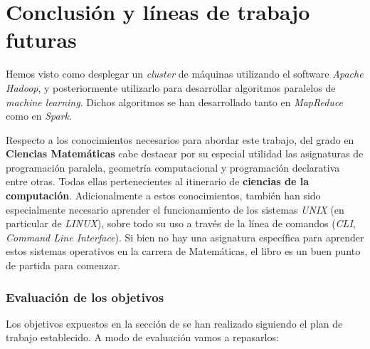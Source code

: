 \chapter*{Conclusión y líneas de trabajo futuras}
Hemos visto como desplegar un \textit{cluster} de máquinas utilizando el software  \textit{Apache Hadoop}, 
y posteriormente utilizarlo para desarrollar algoritmos paralelos de \textit{machine learning}. Dichos algoritmos
se han desarrollado tanto en \textit{MapReduce} como en \textit{Spark}.

Respecto a los conocimientos necesarios para abordar este trabajo, del grado en \textbf{Ciencias Matemáticas}
cabe destacar por su especial utilidad las asignaturas de programación paralela, geometría computacional y 
programación declarativa entre otras. Todas ellas pertenecientes al itinerario de \textbf{ciencias de la computación}.
Adicionalmente a estos conocimientos, también han sido especialmente necesario aprender el funcionamiento
de los sistemas \textit{UNIX} (en particular de \textit{LINUX}), sobre todo su uso a través de la línea de comandos 
(\textit{CLI}, \textit{Command Line Interface}). 
Si bien no hay una asignatura específica para aprender estos sistemas operativos en la carrera de Matemáticas, 
el libro \cite{unix_programming_environment} es un buen punto de partida para comenzar.

\subsection*{Evaluación de los objetivos}
Los objetivos expuestos en la sección de  
se han realizado siguiendo el plan de trabajo establecido. A modo de evaluación vamos a repasarlos:


